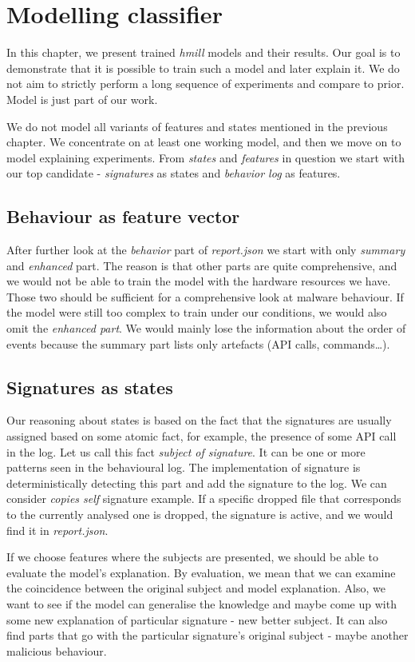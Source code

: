 \chapter{Modelling classifier} \label{chap:models}
In this chapter, we present trained \emph{hmill} models and their results. Our goal is to demonstrate that it is possible to train such a model and later explain it. We do not aim to strictly perform a long sequence of experiments and compare to prior. Model is just part of our work.

We do not model all variants of features and states mentioned in the previous chapter. We concentrate on at least one working model, and then we move on to model explaining experiments. From \emph{states} and \emph{features} in question we start with our top candidate - \emph{signatures} as states and \emph{behavior log} as features. 

\section{Behaviour as feature vector}
After further look at the \emph{behavior} part of \emph{report.json} we start with only \emph{summary} and \emph{enhanced} part. The reason is that other parts are quite comprehensive, and we would not be able to train the model with the hardware resources we have. Those two should be sufficient for a comprehensive look at malware behaviour. If the model were still too complex to train under our conditions, we would also omit the \emph{enhanced part}. We would mainly lose the information about the order of events because the summary part lists only artefacts (API calls, commands\dots).

\section{Signatures as states}
Our reasoning about states is based on the fact that the signatures are usually assigned based on some atomic fact, for example, the presence of some API call in the log. Let us call this fact \emph{subject of signature}. It can be one or more patterns seen in the behavioural log. The implementation of signature is deterministically detecting this part and add the signature to the log. We can consider \emph{copies self} signature example. If a specific dropped file that corresponds to the currently analysed one is dropped, the signature is active, and we would find it in \emph{report.json}.

If we choose features where the subjects are presented, we should be able to evaluate the model's explanation. By evaluation, we mean that we can examine the coincidence between the original subject and model explanation. Also, we want to see if the model can generalise the knowledge and maybe come up with some new explanation of particular signature - new better subject. It can also find parts that go with the particular signature's original subject - maybe another malicious behaviour.


